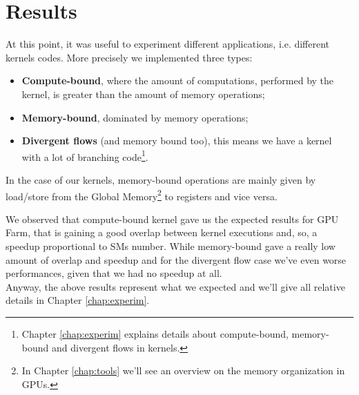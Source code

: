 	
\section{Results}
	At this point, it was useful to experiment different applications, i.e. different kernels codes. More precisely we implemented three types:
	\begin{itemize}
		\item \textbf{Compute-bound}, where the amount of computations, performed by the kernel, is  greater than the amount of memory operations;
		\item \textbf{Memory-bound}, dominated by memory operations;
		\item \textbf{Divergent flows} (and memory bound too), this means we have a kernel with a lot of branching code\footnote{Chapter \ref{chap:experim} explains details about compute-bound, memory-bound and divergent flows in kernels.}.
	\end{itemize}
	In the case of our kernels, memory-bound operations are mainly given by load/store from the Global Memory\footnote{In Chapter \ref{chap:tools} we'll see an overview on the memory organization in GPUs.} to registers and vice versa\cite{cudabestpractices}.
	
	We observed that compute-bound kernel gave us the expected results for GPU Farm, that is gaining a good overlap between kernel executions and, so, a speedup proportional to SMs number.
	While memory-bound gave a really low amount of overlap and speedup and for the divergent flow case we've even worse performances, given that we had no speedup at all.\\
	Anyway, the above results represent what we expected and we'll give all relative details in Chapter \ref{chap:experim}.
	
	
